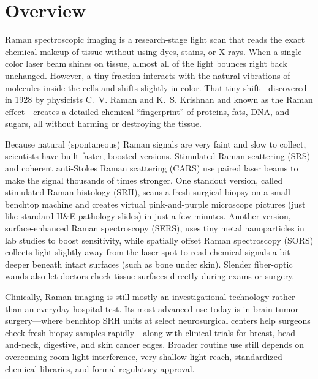 \label{ch:infographic-raman}

\section{Overview}

Raman spectroscopic imaging is a research-stage light scan that reads the exact chemical makeup of tissue without using dyes, stains, or X-rays. When a single-color laser beam shines on tissue, almost all of the light bounces right back unchanged. However, a tiny fraction interacts with the natural vibrations of molecules inside the cells and shifts slightly in color. That tiny shift---discovered in 1928 by physicists C.~V. Raman and K.~S. Krishnan and known as the Raman effect---creates a detailed chemical ``fingerprint'' of proteins, fats, DNA, and sugars, all without harming or destroying the tissue.

Because natural (spontaneous) Raman signals are very faint and slow to collect, scientists have built faster, boosted versions. Stimulated Raman scattering (SRS) and coherent anti-Stokes Raman scattering (CARS) use paired laser beams to make the signal thousands of times stronger. One standout version, called stimulated Raman histology (SRH), scans a fresh surgical biopsy on a small benchtop machine and creates virtual pink-and-purple microscope pictures (just like standard H\&E pathology slides) in just a few minutes. Another version, surface-enhanced Raman spectroscopy (SERS), uses tiny metal nanoparticles in lab studies to boost sensitivity, while spatially offset Raman spectroscopy (SORS) collects light slightly away from the laser spot to read chemical signals a bit deeper beneath intact surfaces (such as bone under skin). Slender fiber-optic wands also let doctors check tissue surfaces directly during exams or surgery.

Clinically, Raman imaging is still mostly an investigational technology rather than an everyday hospital test. Its most advanced use today is in brain tumor surgery---where benchtop SRH units at select neurosurgical centers help surgeons check fresh biopsy samples rapidly---along with clinical trials for breast, head-and-neck, digestive, and skin cancer edges. Broader routine use still depends on overcoming room-light interference, very shallow light reach, standardized chemical libraries, and formal regulatory approval.

